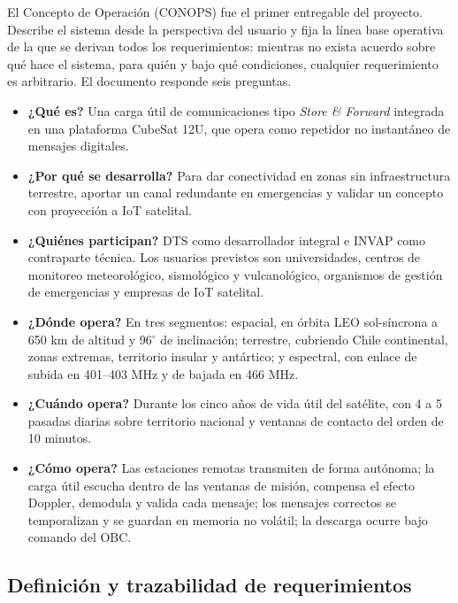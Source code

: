 El Concepto de Operación (CONOPS) fue el primer entregable del proyecto. Describe el sistema desde la perspectiva del usuario y fija la línea base operativa de la que se derivan todos los requerimientos: mientras no exista acuerdo sobre qué hace el sistema, para quién y bajo qué condiciones, cualquier requerimiento es arbitrario. El documento responde seis preguntas.

\begin{itemize}[leftmargin=1.27cm, itemsep=2pt, topsep=4pt, parsep=0pt]
  \item \textbf{¿Qué es?} Una carga útil de comunicaciones tipo \textit{Store \& Forward} integrada en una plataforma CubeSat 12U, que opera como repetidor no instantáneo de mensajes digitales.
  \item \textbf{¿Por qué se desarrolla?} Para dar conectividad en zonas sin infraestructura terrestre, aportar un canal redundante en emergencias y validar un concepto con proyección a IoT satelital.
  \item \textbf{¿Quiénes participan?} DTS como desarrollador integral e INVAP como contraparte técnica. Los usuarios previstos son universidades, centros de monitoreo meteorológico, sismológico y vulcanológico, organismos de gestión de emergencias y empresas de IoT satelital.
  \item \textbf{¿Dónde opera?} En tres segmentos: espacial, en órbita LEO sol-síncrona a 650 km de altitud y 96$^{\circ}$ de inclinación; terrestre, cubriendo Chile continental, zonas extremas, territorio insular y antártico; y espectral, con enlace de subida en 401--403 MHz y de bajada en 466 MHz.
  \item \textbf{¿Cuándo opera?} Durante los cinco años de vida útil del satélite, con 4 a 5 pasadas diarias sobre territorio nacional y ventanas de contacto del orden de 10 minutos.
  \item \textbf{¿Cómo opera?} Las estaciones remotas transmiten de forma autónoma; la carga útil escucha dentro de las ventanas de misión, compensa el efecto Doppler, demodula y valida cada mensaje; los mensajes correctos se temporalizan y se guardan en memoria no volátil; la descarga ocurre bajo comando del OBC.
\end{itemize}


\subsection{Definición y trazabilidad de requerimientos}

